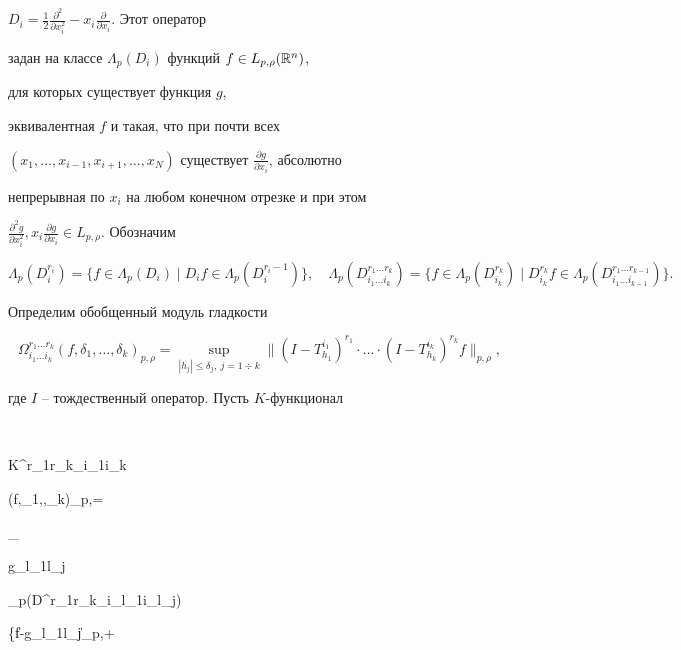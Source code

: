 $D_i=\frac{1}{2}\frac{\partial^2}{\partial x^2_i}- 


x_i\frac{\partial}{\partial x_i}$. Этот оператор 


задан на классе $\Lambda_p(D_i)$ функций $f\in L_{p,\rho}(\Bbb R^n)$, 


для которых существует функция $g$, 


эквивалентная $f$ и такая, что при почти всех 


$(x_1,\dotsc,x_{i-1},x_{i+1},\dotsc,x_N)$ существует $\frac{\partial 


g}{\partial x_i}$, абсолютно 


непрерывная по $x_i$ на любом конечном отрезке и при этом 


$\frac{\partial^2 g}{\partial x^2_i}, x_i\frac{\partial g}{\partial 


x_i}\in L_{p,\rho}$. Обозначим 


$$ 


\Lambda_p(D^{r_i}_i)=\{f\in\Lambda_p(D_i)\mid 


D_i f\in\Lambda_p(D^{r_i-1}_i)\},\quad 


\Lambda_p(D^{r_1\dotsc r_k}_{i_1\dotsc i_k})= 


\{f\in\Lambda_p(D^{r_k}_{i_k})\mid 


D^{r_k}_{i_k}f\in\Lambda_p 


(D^{r_1\dotsc r_{k-1}}_{i_1\dotsc i_{k-1}})\}. 


$$ 


Определим обобщенный модуль гладкости 


$$ 


\Omega^{r_1\dotsc r_k}_{i_1\dotsc i_k} 


(f,\delta_1,\dotsc,\delta_k)_{p,\rho}= 


\sup_{|h_j|\le\delta_j,\ j=1\div k} 


\|(I-T^{i_1}_{h_1})^{r_1}\cdot\dotsc\cdot 


(I-T^{i_k}_{h_k})^{r_k}f\|_{p,\rho}, 


$$ 


где $I$ -- тождественный оператор. Пусть $K$-функционал 


$$ 


K^{r_1\dotsc r_k}_{i_1\dotsc i_k} 


(f,\delta_1,\dotsc,\delta_k)_{p,\rho}= 


\inf_{g_{l_1\dotsc l_j} 


\in\Lambda_p(D^{r_1\dotsc r_k}_{i_{l_1}\dotsc i_{l_j}})} 


\{\|f-\wh\Sigma g_{l_1\dotsc l_j}\|_{p,\rho}+ 


